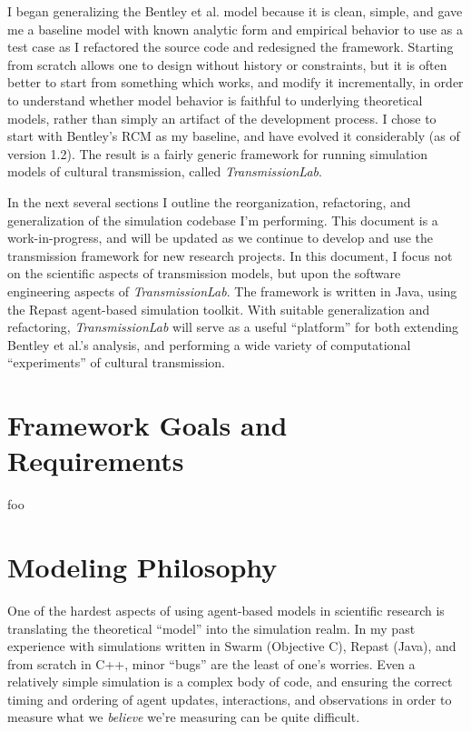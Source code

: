 \documentclass{kluwer-mem-copyright}
\begin{document}
\begin{article}
I began generalizing the Bentley et al. model because it is clean,
simple, and gave me a baseline model with known analytic form and empirical behavior to use as a test case as I refactored the source code and redesigned the framework.   Starting from scratch allows
one to design without history or constraints, but it is often better to start
from something which works, and modify it incrementally, in order to understand whether model behavior is faithful to underlying theoretical models, rather than simply an artifact of the development process.  I chose to start with Bentley's RCM as my baseline, and have evolved it considerably (as of version 1.2).  The result is a fairly generic framework for running 
simulation models of cultural transmission, called \emph{TransmissionLab}.  

In the next several sections I outline the reorganization, refactoring, and
generalization of the simulation codebase I'm performing.  This document is a work-in-progress, and will be updated as we continue to develop and use the transmission framework for new research projects.  In this document, I focus not on the scientific aspects of transmission models, but upon the software engineering
aspects of \emph{TransmissionLab}.  The framework is written in Java, using the Repast agent-based simulation toolkit.  With suitable generalization and refactoring, \emph{TransmissionLab} will serve as a useful ``platform''
for both extending Bentley et al.'s analysis, and performing a wide variety of computational ``experiments'' of cultural transmission. 

\section{Framework Goals and Requirements}
foo

\section{Modeling Philosophy}
One of the hardest aspects of using agent-based models in scientific research is
translating the theoretical ``model'' into the simulation realm.  In my past experience with simulations
written in Swarm (Objective C), Repast (Java), and from scratch in C++, minor
``bugs'' are the least of one's worries.  Even a relatively simple simulation is a complex body
of code, and ensuring the correct timing and ordering of agent updates,
interactions, and observations in order to measure what we \emph{believe} we're
measuring can be quite difficult.  


\end{article}
\end{document}
